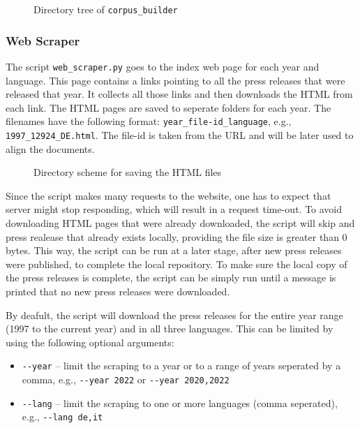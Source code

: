 \begin{figure}

\caption{Directory tree of \texttt{corpus\_builder}}
\end{figure} 
\subsubsection{Web Scraper}
The script \texttt{web\_scraper.py} goes to the index web page for each year and language. 
This page contains a links pointing to all the press releases that were released that year. 
It collects all those links and then downloads the HTML from each link. 
The HTML pages are saved to seperate folders for each year. 
The filenames have the following format: \texttt{year\_file-id\_language}, e.g., \texttt{1997\_12924\_DE.html}. 
The file-id is taken from the URL and will be later used to align the documents. 


\begin{figure}
\caption{Directory scheme for saving the HTML files}
\label{fig:html-scheme}
\end{figure} 

Since the script makes many requests to the website, one has to expect that server might stop responding, which will result in a request time-out. 
To avoid downloading HTML pages that were already downloaded, the script will skip and press realease that already exists locally, providing the file size is greater than 0 bytes.
This way, the script can be run at a later stage, after new press releases were published, to complete the local repository.
To make sure the local copy of the press releases is complete, the script can be simply run until a message is printed that no new press releases were downloaded. 

By deafult, the script will download the press releases for the entire year range (1997 to the current year) and in all three languages. 
This can be limited by using the following optional arguments:
\begin{itemize}
	\item \texttt{-{}-year} -- limit the scraping to a year or to a range of years seperated by a comma, e.g., \texttt{-{}-year 2022} or \texttt{-{}-year 2020,2022}
	\item \texttt{-{}-lang} -- limit the scraping to one or more languages (comma seperated), e.g., \texttt{-{}-lang de,it}
\end{itemize}

